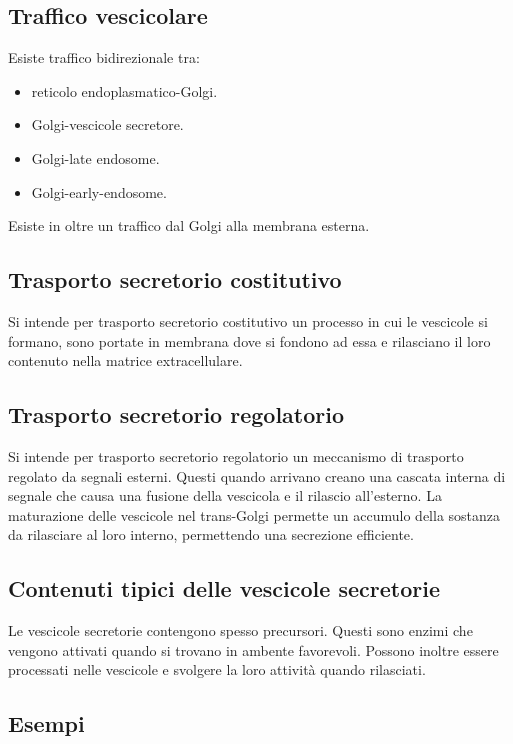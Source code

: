 	\subsection{Traffico vescicolare}
	Esiste traffico bidirezionale tra:
	\begin{multicols}{2}
		\begin{itemize}
			\item reticolo endoplasmatico-Golgi.
			\item Golgi-vescicole secretore.
			\item Golgi-late endosome.
			\item Golgi-early-endosome.
		\end{itemize}
	\end{multicols}
	Esiste in oltre un traffico dal Golgi alla membrana esterna.
	
	\subsection{Trasporto secretorio costitutivo}
	Si intende per trasporto secretorio costitutivo un processo in cui le vescicole si formano, sono portate in membrana dove si fondono ad essa e rilasciano il loro contenuto nella matrice extracellulare.

	\subsection{Trasporto secretorio regolatorio}
	Si intende per trasporto secretorio regolatorio un meccanismo di trasporto regolato da segnali esterni.
	Questi quando arrivano creano una cascata interna di segnale che causa una fusione della vescicola e il rilascio all'esterno.
	La maturazione delle vescicole nel trans-Golgi permette un accumulo della sostanza da rilasciare al loro interno, permettendo una secrezione efficiente.

	\subsection{Contenuti tipici delle vescicole secretorie}
	Le vescicole secretorie contengono spesso precursori.
	Questi sono enzimi che vengono attivati quando si trovano in ambente favorevoli.
	Possono inoltre essere processati nelle vescicole e svolgere la loro attivit\`a quando rilasciati.

	\subsection{Esempi}
		
